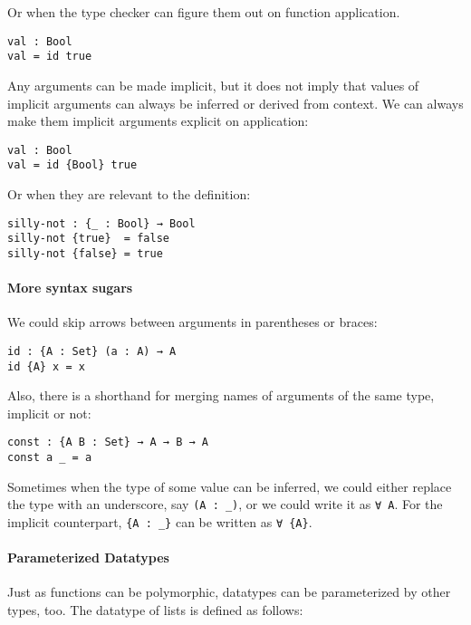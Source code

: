 \documentclass[../thesis.tex]{subfiles}
\begin{document}
Or when the type checker can figure them out on function application.

\begin{lstlisting}
val : Bool
val = id true
\end{lstlisting}

Any arguments can be made implicit, but it does not imply that values of
implicit arguments can always be inferred or derived from context. We can always
make them implicit arguments explicit on application:

\begin{lstlisting}
val : Bool
val = id {Bool} true
\end{lstlisting}

Or when they are relevant to the definition:

\begin{lstlisting}
silly-not : {_ : Bool} → Bool
silly-not {true}  = false
silly-not {false} = true
\end{lstlisting}

\paragraph{More syntax sugars}

We could skip arrows between arguments in parentheses or braces:

\begin{lstlisting}
id : {A : Set} (a : A) → A
id {A} x = x
\end{lstlisting}

Also, there is a shorthand for merging names of arguments of the same type, implicit or not:

\begin{lstlisting}
const : {A B : Set} → A → B → A
const a _ = a
\end{lstlisting}

Sometimes when the type of some value can be inferred, we could either replace
the type with an underscore, say {\lstinline|(A : _)|}, or we could write it as
{\lstinline|∀ A|}. For the implicit counterpart, {\lstinline|{A : _}|} can be
written as {\lstinline|∀ {A}|}.

\paragraph{Parameterized Datatypes}


Just as functions can be polymorphic, datatypes can be parameterized by other
types, too. The datatype of lists is defined as follows:
\end{document}
